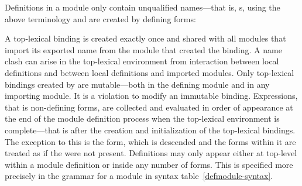 %
\begin{optDefinition}
Definitions in a module only contain unqualified names---that is,
s, using the above terminology and are created by defining forms:
%

A top-lexical binding is created exactly once and shared with all modules that
import its exported name from the module that created the binding.  A name clash
can arise in the top-lexical environment from interaction between local
definitions and between local definitions and imported modules.  Only
top-lexical bindings created by  are mutable---both in the
defining module and in any importing module.  It is a violation to modify an
immutable binding.  Expressions, that is non-defining forms, are collected and
evaluated in order of appearance at the end of the module definition process
when the top-lexical environment is complete---that is after the creation and
initialization of the top-lexical bindings.  The exception to this is the
 form, which is descended and the forms within it are treated
as if the  were not present.  Definitions may only appear
either at top-level within a module definition or inside any number of
 forms.  This is specified more precisely in the grammar for a
module in syntax table~\ref{defmodule-syntax}.
%
\end{optDefinition}

